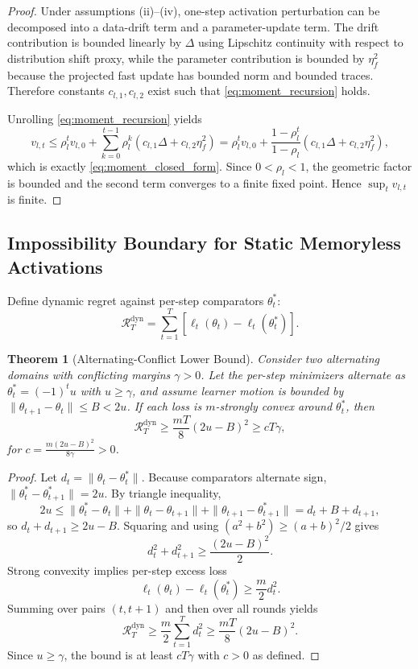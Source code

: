 \documentclass{article} %
\newtheorem{theorem}{Theorem}[section]
\begin{document}
\begin{proof}
Under assumptions (ii)--(iv), one-step activation perturbation can be decomposed into a data-drift term and a parameter-update term. The drift contribution is bounded linearly by $\Delta$ using Lipschitz continuity with respect to distribution shift proxy, while the parameter contribution is bounded by $\eta_f^2$ because the projected fast update has bounded norm and bounded traces. Therefore constants $c_{l,1},c_{l,2}$ exist such that \eqref{eq:moment_recursion} holds.

Unrolling \eqref{eq:moment_recursion} yields
\[
v_{l,t}\le \rho_l^t v_{l,0}+\sum_{k=0}^{t-1}\rho_l^k\left(c_{l,1}\Delta+c_{l,2}\eta_f^2\right)
=\rho_l^t v_{l,0}+\frac{1-\rho_l^t}{1-\rho_l}\left(c_{l,1}\Delta+c_{l,2}\eta_f^2\right),
\]
which is exactly \eqref{eq:moment_closed_form}. Since $0<\rho_l<1$, the geometric factor is bounded and the second term converges to a finite fixed point. Hence $\sup_t v_{l,t}$ is finite.
\end{proof}

\subsection{Impossibility Boundary for Static Memoryless Activations}
Define dynamic regret against per-step comparators $\theta_t^*$:
\begin{equation}
\mathcal{R}_T^{\mathrm{dyn}}=\sum_{t=1}^T\left[\ell_t(\theta_t)-\ell_t(\theta_t^*)\right].
\label{eq:dynamic_regret}
\end{equation}

\begin{theorem}[Alternating-Conflict Lower Bound]
\label{thm:static_lower_bound}
Consider two alternating domains with conflicting margins $\gamma>0$. Let the per-step minimizers alternate as $\theta_t^*=(-1)^t u$ with $u\ge \gamma$, and assume learner motion is bounded by $\|\theta_{t+1}-\theta_t\|\le B<2u$. If each loss is $m$-strongly convex around $\theta_t^*$, then
\begin{equation}
\mathcal{R}_T^{\mathrm{dyn}}\ge \frac{mT}{8}(2u-B)^2
\ge cT\gamma,
\label{eq:regret_lower_bound}
\end{equation}
for $c=\frac{m(2u-B)^2}{8\gamma}>0$.
\end{theorem}

\begin{proof}
Let $d_t=\|\theta_t-\theta_t^*\|$. Because comparators alternate sign, $\|\theta_t^*-\theta_{t+1}^*\|=2u$. By triangle inequality,
\[
2u \le \|\theta_t^*-\theta_t\|+\|\theta_t-\theta_{t+1}\|+\|\theta_{t+1}-\theta_{t+1}^*\|=d_t+B+d_{t+1},
\]
so $d_t+d_{t+1}\ge 2u-B$. Squaring and using $(a^2+b^2)\ge (a+b)^2/2$ gives
\[
d_t^2+d_{t+1}^2\ge \frac{(2u-B)^2}{2}.
\]
Strong convexity implies per-step excess loss
\[
\ell_t(\theta_t)-\ell_t(\theta_t^*)\ge \frac{m}{2}d_t^2.
\]
Summing over pairs $(t,t+1)$ and then over all rounds yields
\[
\mathcal{R}_T^{\mathrm{dyn}}\ge \frac{m}{2}\sum_{t=1}^T d_t^2 \ge \frac{mT}{8}(2u-B)^2.
\]
Since $u\ge\gamma$, the bound is at least $cT\gamma$ with $c>0$ as defined.
\end{proof}
\end{document}
